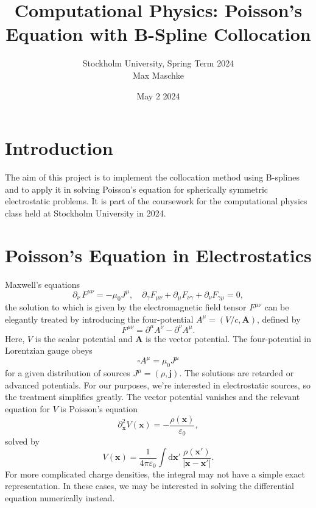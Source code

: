 \documentclass[a4paper,DIV=12,english]{scrartcl}
\title{Computational Physics: Poisson's Equation with B-Spline Collocation}
\author{Stockholm University, Spring Term 2024 \\Max Maschke}
\date{May 2 2024}
\begin{document}
\maketitle


\tableofcontents
\newpage


\newpage
\section{Introduction}
The aim of this project is to implement the collocation method using B-splines and to apply it in solving Poisson's equation for spherically symmetric electrostatic problems. It is part of the coursework for the computational physics class held at Stockholm University in 2024.

\section{Poisson's Equation in Electrostatics}
Maxwell's equations
\begin{equation}
    \partial_\nu \, F^{\mu\nu} = -\mu_0 J^\mu,\quad \partial_\gamma F_{\mu\nu} + \partial_\mu F_{\nu\gamma} + \partial_\nu F_{\gamma\mu} = 0,
\end{equation}
the solution to which is given by the electromagnetic field tensor $F^{\mu\nu}$ can be elegantly treated by introducing the four-potential $A^\mu = (V/c, \textbf{A})$, defined by
\begin{equation}
    F^{\mu\nu} = \partial^\mu A^\nu - \partial^\nu A^\mu. 
\end{equation}
Here, $V$ is the scalar potential and $\textbf{A}$ is the vector potential. The four-potential in Lorentzian gauge obeys
\begin{equation}
    \square A^\mu = \mu_0 J^\mu
\end{equation}
for a given distribution of sources $J^\mu = (\rho, \textbf{j})$. The solutions are retarded or advanced potentials. For our purposes, we're interested in electrostatic sources, so the treatment simplifies greatly. The vector potential vanishes and the relevant equation for $V$ is Poisson's equation
\begin{equation}\label{eq:poisson}
    \partial_\textbf{x}^2 V(\textbf{x}) = -\frac{\rho(\textbf{x})}{\varepsilon_0},
\end{equation}
solved by
\begin{equation}
    V(\textbf{x}) = \frac{1}{4\pi\varepsilon_0} \int \text{d}\textbf{x}'\, \frac{\rho(\textbf{x}')}{\left|\textbf{x}-\textbf{x}'\right|}.
\end{equation}
For more complicated charge densities, the integral may not have a simple exact representation. In these cases, we may be interested in solving the differential equation numerically instead.
\end{document}
